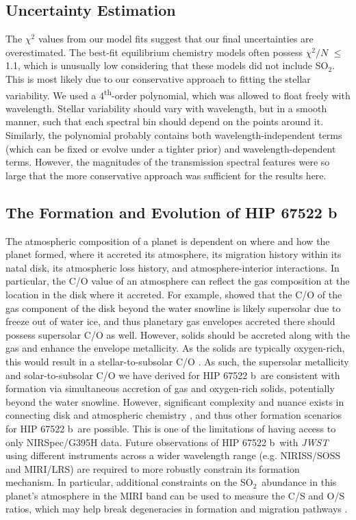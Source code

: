 \documentclass[twocolumn]{aastex63} %
\newcommand{\jwst}{\textit{JWST}}
\newcommand{\sotwo}{SO$_2$}
\newcommand{\plname}{HIP 67522 b}
\begin{document}
\subsection{Uncertainty Estimation}

The $\chi^2$ values from our model fits suggest that our final uncertainties are overestimated. The best-fit equilibrium chemistry models often possess $\chi^2/N$ $\leq$ 1.1, which is unusually low considering that these models did not include SO$_2$. This is most likely due to our conservative approach to fitting the stellar variability. We used a 4\textsuperscript{th}-order polynomial, which was allowed to float freely with wavelength. Stellar variability should vary with wavelength, but in a smooth manner, such that each spectral bin should depend on the points around it. Similarly, the polynomial probably contains both wavelength-independent terms (which can be fixed or evolve under a tighter prior) and wavelength-dependent terms. However, the magnitudes of the transmission spectral features were so large that the more conservative approach was sufficient for the results here. 


\subsection{The Formation and Evolution of \plname}

The atmospheric composition of a planet is dependent on where and how the planet formed, where it accreted its atmosphere, its migration history within its natal disk, its atmospheric loss history, and atmosphere-interior interactions. In particular, the C/O value of an atmosphere can reflect the gas composition at the location in the disk where it accreted. For example, \citet{oberg2011effects} showed that the C/O of the gas component of the disk beyond the water snowline is likely supersolar due to freeze out of water ice, and thus planetary gas envelopes accreted there should possess supersolar C/O as well. However, solids should be accreted along with the gas and enhance the envelope metallicity. As the solids are typically oxygen-rich, this would result in a stellar-to-subsolar C/O \citep{mordasini16,espinoza2017, cridland2019}. As such, the supersolar metallicity and solar-to-subsolar C/O we have derived for \plname\, are consistent with formation via simultaneous accretion of gas and oxygen-rich solids, potentially beyond the water snowline. However, significant complexity and nuance exists in connecting disk and atmospheric chemistry \citep[e.g.][]{Madhusudhan2017,Eistrup2018}, and thus other formation scenarios for \plname\, are possible. 
This is one of the limitations of having access to only NIRSpec/G395H data. Future observations of \plname\, with \jwst\, using different instruments across a wider wavelength range (e.g. NIRISS/SOSS and MIRI/LRS) are required to more robustly constrain its formation mechanism. In particular, additional constraints on the \sotwo\, abundance in this planet's atmosphere in the MIRI band \citep[e.g.][]{powell24} can be used to measure the C/S and O/S ratios, which may help break degeneracies in formation and migration pathways \citep{Turrini2021,crossfield23}.
\end{document}
